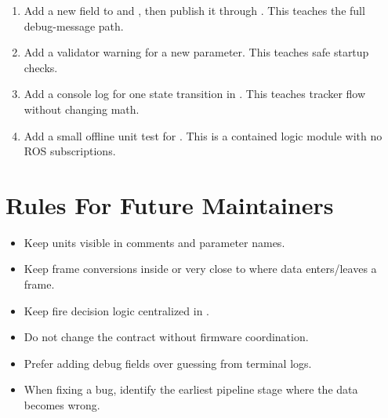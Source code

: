 \begin{enumerate}
  \item Add a new field to  and , then
  publish it through . This teaches the full debug-message
  path.
  \item Add a validator warning for a new parameter. This teaches safe startup
  checks.
  \item Add a console log for one state transition in .
  This teaches tracker flow without changing math.
  \item Add a small offline unit test for . This is a
  contained logic module with no ROS subscriptions.
\end{enumerate}

\section{Rules For Future Maintainers}

\begin{itemize}
  \item Keep units visible in comments and parameter names.
  \item Keep frame conversions inside  or very close to
  where data enters/leaves a frame.
  \item Keep fire decision logic centralized in .
  \item Do not change the  contract without
  firmware coordination.
  \item Prefer adding debug fields over guessing from terminal logs.
  \item When fixing a bug, identify the earliest pipeline stage where the data
  becomes wrong.
\end{itemize}
